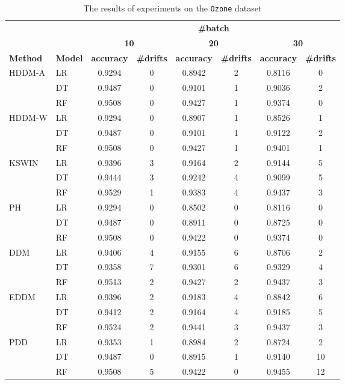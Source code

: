 \begin{table}[H]
    \centering
    \small
    \caption{The results of experiments on the \texttt{Ozone} dataset}
    \label{tab:exp_Ozone}
    \begin{tabular}{llcccccc}\toprule
        && \multicolumn{6}{c}{\textbf{\#batch}}\\\cmidrule(lr){3-8}
        && \multicolumn{2}{c}{\textbf{10}}    & \multicolumn{2}{c}{\textbf{20}} & \multicolumn{2}{c}{\textbf{30}} \\\cmidrule(lr){3-8}
        \textbf{Method} & \textbf{Model} & \textbf{accuracy} & \textbf{\#drifts} & \textbf{accuracy} & \textbf{\#drifts} & \textbf{accuracy} & \textbf{\#drifts} \\\midrule
        HDDM-A & LR & 0.9294 & 0 & 0.8942 & 2 & 0.8116 & 0 \\
        & DT & 0.9487 & 0 & 0.9101 & 1 & 0.9036 & 2 \\
        & RF & 0.9508 & 0 & 0.9427 & 1 & 0.9374 & 0 \\
        \midrule
        HDDM-W & LR & 0.9294 & 0 & 0.8907 & 1 & 0.8526 & 1 \\
        & DT & 0.9487 & 0 & 0.9101 & 1 & 0.9122 & 2 \\
        & RF & 0.9508 & 0 & 0.9427 & 1 & 0.9401 & 1 \\
        \midrule
        KSWIN & LR & 0.9396 & 3 & 0.9164 & 2 & 0.9144 & 5 \\
        & DT & 0.9444 & 3 & 0.9242 & 4 & 0.9099 & 5 \\
        & RF & 0.9529 & 1 & 0.9383 & 4 & 0.9437 & 3 \\
        \midrule
        PH & LR & 0.9294 & 0 & 0.8502 & 0 & 0.8116 & 0 \\
        & DT & 0.9487 & 0 & 0.8911 & 0 & 0.8725 & 0 \\
        & RF & 0.9508 & 0 & 0.9422 & 0 & 0.9374 & 0 \\
        \midrule
        DDM & LR & 0.9406 & 4 & 0.9155 & 6 & 0.8706 & 2 \\
        & DT & 0.9358 & 7 & 0.9301 & 6 & 0.9329 & 4 \\
        & RF & 0.9513 & 2 & 0.9427 & 2 & 0.9437 & 3 \\
        \midrule
        EDDM & LR & 0.9396 & 2 & 0.9183 & 4 & 0.8842 & 6 \\
        & DT & 0.9412 & 2 & 0.9164 & 4 & 0.9185 & 5 \\
        & RF & 0.9524 & 2 & 0.9441 & 3 & 0.9437 & 3 \\
        \midrule
        PDD & LR & 0.9353 & 1 & 0.8984 & 2 & 0.8724 & 2 \\
        & DT & 0.9487 & 0 & 0.8915 & 1 & 0.9140 & 10 \\
        & RF & 0.9508 & 5 & 0.9422 & 0 & 0.9455 & 12 \\
        \midrule
    \end{tabular}
\end{table}

